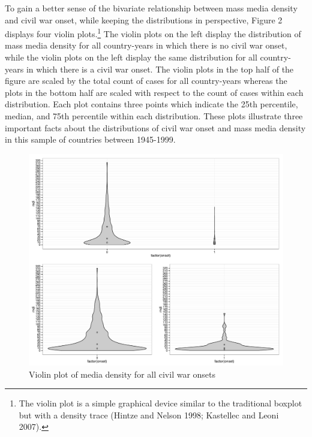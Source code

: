 \documentclass[11pt,article,oneside]{memoir}
\makeatletter
\def\maxwidth{\ifdim\Gin@nat@width>\linewidth\linewidth
\else\Gin@nat@width\fi}
\let\Oldincludegraphics\includegraphics
\renewcommand{\includegraphics}[1]{\Oldincludegraphics[width=\maxwidth]{#1}}
\makeatother
\begin{document}
To gain a better sense of the bivariate relationship between mass media
density and civil war onset, while keeping the distributions in
perspective, Figure 2 displays four violin plots.\footnote{The violin
  plot is a simple graphical device similar to the traditional boxplot
  but with a density trace (Hintze and Nelson 1998; Kastellec and Leoni
  2007).} The violin plots on the left display the distribution of mass
media density for all country-years in which there is no civil war
onset, while the violin plots on the left display the same distribution
for all country-years in which there is a civil war onset. The violin
plots in the top half of the figure are scaled by the total count of
cases for all country-years whereas the plots in the bottom half are
scaled with respect to the count of cases within each distribution. Each
plot contains three points which indicate the 25th percentile, median,
and 75th percentile within each distribution. These plots illustrate
three important facts about the distributions of civil war onset and
mass media density in this sample of countries between 1945-1999.

\begin{figure}[htbp]
\centering
\includegraphics{media_civil_war_files/figure-markdown/violinplot.pdf}
\caption{Violin plot of media density for all civil war onsets}
\end{figure}
\end{document}
